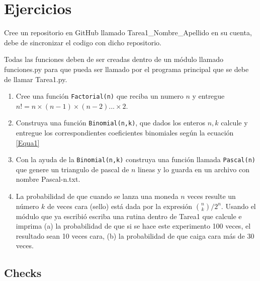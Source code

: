 \documentclass[12pt]{article}
\begin{document}
\section{Ejercicios}

Cree un repositorio en GitHub llamado Tarea1\_Nombre\_Apellido en su cuenta, debe de sincronizar el codigo con dicho repositorio.

Todas las funciones deben de ser creadas dentro de un módulo llamado funciones.py para que pueda ser llamado por el programa principal que se debe de llamar Tarea1.py.

\begin{enumerate}\setlength{\itemsep}{0pt}
	
\item Cree una función \texttt{Factorial(n)} que reciba un numero $n$ y entregue $n!=n\times(n-1)\times(n-2)...\times2$.

\item Construya una función \texttt{Binomial(n,k)}, que dados los enteros $n, k$ calcule y entregue los correspondientes coeficientes binomiales según la ecuación \ref{Equa1}

\item Con la ayuda de la \texttt{Binomial(n,k)} construya una función llamada \texttt{Pascal(n)} que genere un triangulo de pascal de $n$ lineas y lo guarda en un archivo con nombre Pascal-n.txt.
  
\item La probabilidad de que cuando se lanza una moneda $n$ veces resulte un número $k$ de veces cara (sello) está dada por la expresión ${n\choose k}/2^n$. Usando el módulo que ya escribió escriba una rutina dentro de Tarea1 que calcule e imprima (a) la probabilidad de que si se hace este experimento 100 veces, el resultado sean 10 veces cara, (b) la probabilidad de que caiga cara más de 30 veces.


\end{enumerate}

\subsection{Checks}
\end{document}

